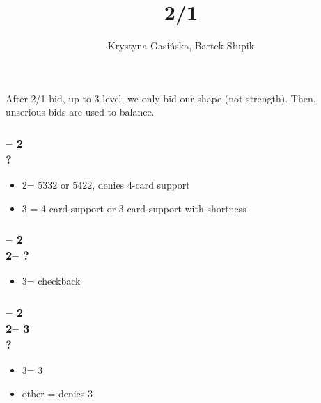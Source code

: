 \documentclass[12pt, a4paper]{article}
\title{2/1 \gf}
\author{Krystyna Gasińska, Bartek Słupik}
\begin{document}
\maketitle


After 2/1 bid, up to 3 level, we only bid our shape (not strength).
Then, unserious bids are used to balance.

\subsubsection*{ -- 2 \\ ?}
\begin{itemize}
    \item 2\nt = 5332 or 5422, denies 4-card support
    \item 3 = 4-card support or 3-card support with shortness
\end{itemize}

\subsubsection*{ -- 2 
                \\ 2\nt -- ?}
\begin{itemize}
    \item 3\clubs = checkback
\end{itemize}

\subsubsection*{ -- 2 
                \\ 2\nt -- 3\clubs \\ ?}
\begin{itemize}
    \item 3\diams = 3 \imp
    \item other = denies 3
\end{itemize}

\end{document}
